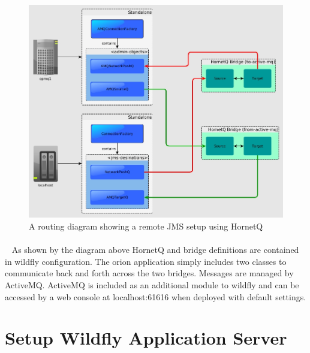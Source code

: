 \documentclass[
10pt, %
letterpaper, %
oneside, %
headinclude,footinclude, %
BCOR5mm, %
]{scrartcl}
\begin{document}
\begin{figure}[h]
\centering
\includegraphics[width=15.5cm]{ConnectionDiagram} %
\caption{A routing diagram showing a remote JMS setup using HornetQ}
\label{fig:connections}
\end{figure}


\paragraph{}~\newline
As shown by the diagram above HornetQ and bridge definitions are contained in wildfly configuration. The orion application simply includes two classes to communicate back and forth across the two bridges. Messages are managed by ActiveMQ. ActiveMQ is included as an additional module to wildfly and can be accessed by a web console at localhost:61616 when deployed with default settings.


\section{Setup Wildfly Application Server}

\end{document}
